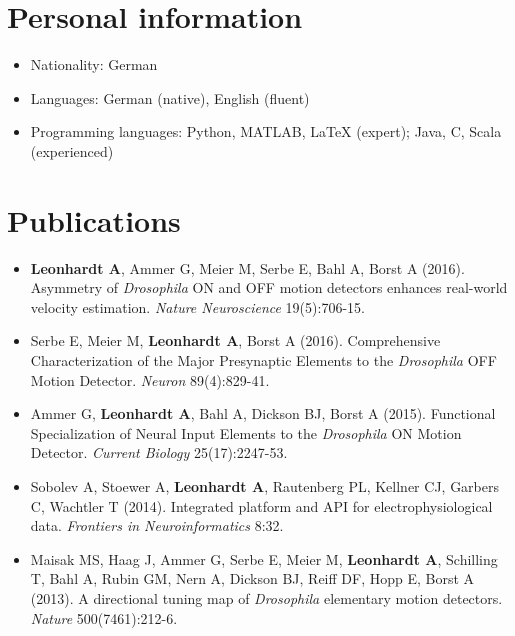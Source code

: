 \section*{Personal information}

\begin{itemize}
     \item Nationality: German
     \item Languages: German (native), English (fluent)
     \item Programming languages: Python, MATLAB, LaTeX (expert); Java, C, Scala (experienced)
\end{itemize}

\section*{Publications}

\begin{itemize}
     
    \item \textbf{Leonhardt A}, Ammer G, Meier M, Serbe E, Bahl A, Borst A (2016). Asymmetry of \textit{Drosophila} ON and OFF motion detectors enhances real-world velocity estimation. \textit{Nature Neuroscience} 19(5):706-15.
    
    \item Serbe E, Meier M, \textbf{Leonhardt A}, Borst A (2016). Comprehensive Characterization of the Major Presynaptic Elements to the \textit{Drosophila} OFF Motion Detector. \textit{Neuron} 89(4):829-41.
        
    \item Ammer G, \textbf{Leonhardt A}, Bahl A, Dickson BJ, Borst A (2015). Functional Specialization of Neural Input Elements to the \textit{Drosophila} ON Motion Detector. \textit{Current Biology} 25(17):2247-53.
        
    \item Sobolev A, Stoewer A, \textbf{Leonhardt A}, Rautenberg PL, Kellner CJ, Garbers C, Wachtler T (2014). Integrated platform and API for electrophysiological data. \textit{Frontiers in Neuroinformatics} 8:32.
    
    \item Maisak MS, Haag J, Ammer G, Serbe E, Meier M, \textbf{Leonhardt A}, Schilling T, Bahl A, Rubin GM, Nern A, Dickson BJ, Reiff DF, Hopp E, Borst A (2013). A directional tuning map of \textit{Drosophila} elementary motion detectors. \textit{Nature} 500(7461):212-6.
    
\end{itemize}